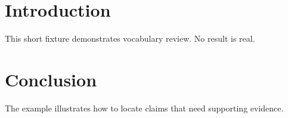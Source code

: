 \documentclass{article}
\begin{document}
\begin{abstract}
We leverage a fixed evaluation protocol to compare two synthetic methods.
The proposed method outperforms the baseline on the demonstration split.
\end{abstract}
\section{Introduction}
This short fixture demonstrates vocabulary review. No result is real.
\section{Conclusion}
The example illustrates how to locate claims that need supporting evidence.
\end{document}
